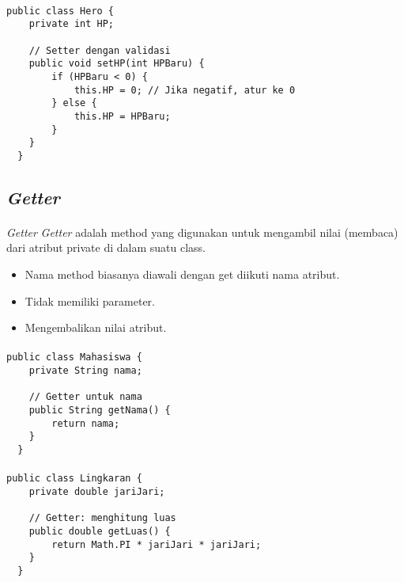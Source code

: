 \documentclass{../praktikum-ppt}
\begin{document}
    \begin{frame}[fragile]{\insertsection}
      \framesubtitle{\insertsubsection}
      \begin{lstlisting}[caption={Validasi dalam \textit{setter}}]
  public class Hero {
    private int HP;

    // Setter dengan validasi
    public void setHP(int HPBaru) {
        if (HPBaru < 0) {
            this.HP = 0; // Jika negatif, atur ke 0
        } else {
            this.HP = HPBaru;
        }
    }
  }
      \end{lstlisting}
    \end{frame}

    \subsection{\textit{Getter}}
    \begin{frame}{\insertsection}
      \framesubtitle{\insertsubsection}
      \begin{block}{\textit{Getter}}
        \textit{Getter} adalah method yang digunakan untuk mengambil nilai (membaca) dari atribut private di dalam suatu class.
        \begin{itemize}
          \item Nama method biasanya diawali dengan get diikuti nama atribut.
          \item Tidak memiliki parameter.
          \item Mengembalikan nilai atribut.
        \end{itemize}
      \end{block}
    \end{frame}

    \begin{frame}[fragile]{\insertsection}
      \framesubtitle{\insertsubsection}
      \begin{lstlisting}[caption={Penggunaan \textit{getter}}]
  public class Mahasiswa {
    private String nama;

    // Getter untuk nama
    public String getNama() {
        return nama;
    }
  }
      \end{lstlisting}
    \end{frame}

    \begin{frame}[fragile]{\insertsection}
      \framesubtitle{\insertsubsection}
      \begin{lstlisting}[caption={Perhitungan dalam \textit{getter}}]
  public class Lingkaran {
    private double jariJari;

    // Getter: menghitung luas
    public double getLuas() {
        return Math.PI * jariJari * jariJari;
    }
  }
      \end{lstlisting}
    \end{frame}
\end{document}

